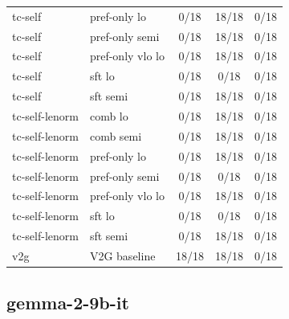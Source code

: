 \documentclass[10pt,landscape]{article}
\begin{document}
\begin{tabular}{llccc}
tc-self & pref-only lo & \cellcolor{missing}0/18 & \cellcolor{done}18/18 & \cellcolor{missing}0/18 \\
tc-self & pref-only semi & \cellcolor{missing}0/18 & \cellcolor{done}18/18 & \cellcolor{missing}0/18 \\
tc-self & pref-only vlo lo & \cellcolor{missing}0/18 & \cellcolor{done}18/18 & \cellcolor{missing}0/18 \\
tc-self & sft lo & \cellcolor{missing}0/18 & \cellcolor{missing}0/18 & \cellcolor{missing}0/18 \\
tc-self & sft semi & \cellcolor{missing}0/18 & \cellcolor{done}18/18 & \cellcolor{missing}0/18 \\
tc-self-lenorm & comb lo & \cellcolor{missing}0/18 & \cellcolor{done}18/18 & \cellcolor{missing}0/18 \\
tc-self-lenorm & comb semi & \cellcolor{missing}0/18 & \cellcolor{done}18/18 & \cellcolor{missing}0/18 \\
tc-self-lenorm & pref-only lo & \cellcolor{missing}0/18 & \cellcolor{done}18/18 & \cellcolor{missing}0/18 \\
tc-self-lenorm & pref-only semi & \cellcolor{missing}0/18 & \cellcolor{missing}0/18 & \cellcolor{missing}0/18 \\
tc-self-lenorm & pref-only vlo lo & \cellcolor{missing}0/18 & \cellcolor{done}18/18 & \cellcolor{missing}0/18 \\
tc-self-lenorm & sft lo & \cellcolor{missing}0/18 & \cellcolor{missing}0/18 & \cellcolor{missing}0/18 \\
tc-self-lenorm & sft semi & \cellcolor{missing}0/18 & \cellcolor{done}18/18 & \cellcolor{missing}0/18 \\
v2g & V2G baseline & \cellcolor{done}18/18 & \cellcolor{done}18/18 & \cellcolor{missing}0/18 \\
\bottomrule
\end{tabular}
\vspace{1em}

\subsection*{gemma-2-9b-it}
\end{document}
